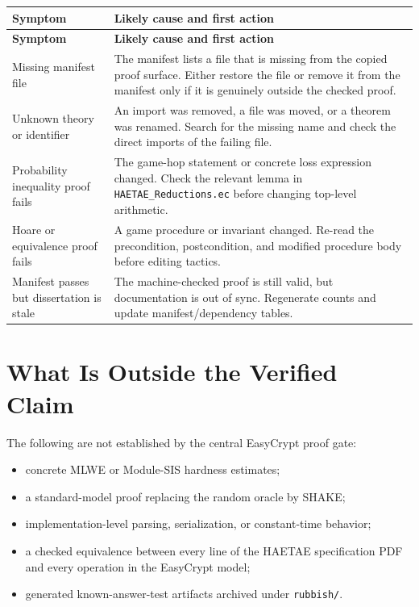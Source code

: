 \documentclass[11pt]{article}
\newcommand{\file}[1]{\nolinkurl{#1}}
\begin{document}
\begin{longtable}{p{}p{}}
\toprule
\textbf{Symptom} & \textbf{Likely cause and first action} \\
\midrule
\endfirsthead
\toprule
\textbf{Symptom} & \textbf{Likely cause and first action} \\
\midrule
\endhead
Missing manifest file &
The manifest lists a file that is missing from the copied proof surface.  Either
restore the file or remove it from the manifest only if it is genuinely outside
the checked proof. \\
Unknown theory or identifier &
An import was removed, a file was moved, or a theorem was renamed.  Search for
the missing name and check the direct imports of the failing file. \\
Probability inequality proof fails &
The game-hop statement or concrete loss expression changed.  Check the relevant
lemma in \file{HAETAE_Reductions.ec} before changing top-level arithmetic. \\
Hoare or equivalence proof fails &
A game procedure or invariant changed.  Re-read the precondition, postcondition,
and modified procedure body before editing tactics. \\
Manifest passes but dissertation is stale &
The machine-checked proof is still valid, but documentation is out of sync.
Regenerate counts and update manifest/dependency tables. \\
\bottomrule
\end{longtable}

\section{What Is Outside the Verified Claim}

The following are not established by the central EasyCrypt proof gate:

\begin{itemize}[leftmargin=*]
  \item concrete MLWE or Module-SIS hardness estimates;
  \item a standard-model proof replacing the random oracle by SHAKE;
  \item implementation-level parsing, serialization, or constant-time behavior;
  \item a checked equivalence between every line of the HAETAE specification PDF
  and every operation in the EasyCrypt model;
  \item generated known-answer-test artifacts archived under \file{rubbish/}.
\end{itemize}
\end{document}
